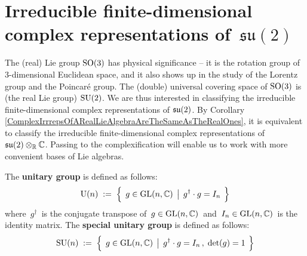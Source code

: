 

\section{Irreducible finite-dimensional complex representations of \,$\mathfrak{su}(2)$}
\setcounter{theorem}{0}
\setcounter{equation}{0}


\renewcommand{\theenumi}{\roman{enumi}}
\renewcommand{\labelenumi}{\textnormal{(\theenumi)}$\;\;$}


\vskip 0.3cm
\begin{remark}
\mbox{}
\vskip 0.1cm
\noindent
The (real) Lie group $\textnormal{SO}(3)$ has physical significance --
it is the rotation group of $3$-dimensional Euclidean space, and
it also shows up in the study of the Lorentz group and the Poincaré group.
The (double) universal covering space of $\textnormal{SO}(3)$ is (the real Lie group) $\textnormal{SU}(2)$.
We are thus interested in classifying the irreducible finite-dimensional complex representations of $\mathfrak{su}(2)$.
By Corollary \ref{ComplexIrrrepsOfARealLieAlgebraAreTheSameAsTheRealOnes},
it is equivalent to classify the irreducible finite-dimensional complex representations of $\mathfrak{su}(2) \otimes_{\mathbb{R}} \mathbb{C}$.
Passing to the complexification will enable us to work with more convenient bases of Lie algebras.
\end{remark}


\vskip 0.5cm
\begin{definition}
\mbox{}
\vskip 0.1cm
\noindent
The \textbf{unitary group} is defined as follows:
\begin{equation*}
\textnormal{U}(n)
\; := \;
	\left\{\;\,
		g \overset{{\color{white}.}}{\in} \textnormal{GL}(n,\C)
		\;\left\vert\;\,
			g^{\dagger} \cdot g = I_{n}
			\right.
		\;\right\}
\end{equation*}
where \,$g^{\dagger}$\, is the conjugate transpose of
\,$g \in \textnormal{GL}(n,\mathbb{C})$\,
and
\,$I_{n} \in \textnormal{GL}(n,\mathbb{C})$\,
is the identity matrix.
\vskip 0.1cm
\noindent
The \textbf{special unitary group} is defined as follows:
\begin{equation*}
\textnormal{SU}(n)
\; := \;
	\left\{\;\,
		g \overset{{\color{white}.}}{\in} \textnormal{GL}(n,\C)
		\;\left\vert\;\,
			g^{\dagger} \cdot g = I_{n}\,,
			\;
			\textnormal{det}(g) = 1
			\right.
		\;\right\}
\end{equation*}
\end{definition}

